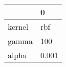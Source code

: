 \begin{tabular}{ll}
\toprule
{} &      0 \\
\midrule
kernel &    rbf \\
gamma  &    100 \\
alpha  &  0.001 \\
\bottomrule
\end{tabular}
